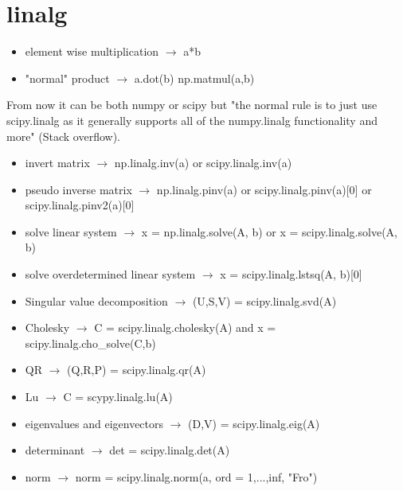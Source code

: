 \documentclass{article}
\begin{document}
\section{linalg}
\begin{itemize}
\item element wise multiplication $\rightarrow$ a*b
\item "normal" product  $\rightarrow$ a.dot(b) np.matmul(a,b)
\end{itemize}
From now it can be both numpy or scipy but "the normal rule is to just use scipy.linalg as it generally supports all of the numpy.linalg functionality and more" (Stack overflow).
\begin{itemize}
\item invert matrix $\rightarrow$ np.linalg.inv(a) or scipy.linalg.inv(a)
\item pseudo inverse matrix $\rightarrow$ np.linalg.pinv(a) or scipy.linalg.pinv(a)[0] or scipy.linalg.pinv2(a)[0]
\item solve linear system  $\rightarrow$ x = np.linalg.solve(A, b) or x = scipy.linalg.solve(A, b)
\item solve  overdetermined linear system $\rightarrow$ x = scipy.linalg.lstsq(A, b)[0]
\item Singular value decomposition $\rightarrow$ (U,S,V) = scipy.linalg.svd(A)
\item Cholesky $\rightarrow$ C = scipy.linalg.cholesky(A) and x = scipy.linalg.cho\_solve(C,b)
\item QR $\rightarrow$ (Q,R,P) = scipy.linalg.qr(A)
\item Lu $\rightarrow$ C = scypy.linalg.lu(A)
\item eigenvalues and eigenvectors $\rightarrow$ (D,V) = scipy.linalg.eig(A)
\item determinant $\rightarrow$ det = scipy.linalg.det(A)
\item norm $\rightarrow$ norm = scipy.linalg.norm(a, ord = 1,...,inf, "Fro")
\end{itemize}
\end{document}
